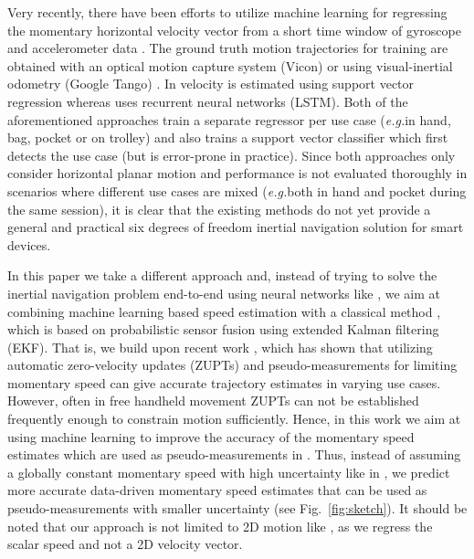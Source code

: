 \documentclass{article}
\newcommand{\eg}{\textit{e.g.}}
\begin{document}
Very recently, there have been efforts to utilize machine learning for regressing the momentary horizontal velocity vector from a short time window of gyroscope and accelerometer data \cite{Yan+Shan+Furukawa:2017,Chen+Lu+Markham+Trigoni:2018}. The ground truth motion trajectories for training are obtained with an optical motion capture system (Vicon) \cite{Chen+Lu+Markham+Trigoni:2018} or using visual-inertial odometry (Google Tango) \cite{Yan+Shan+Furukawa:2017}. In \cite{Yan+Shan+Furukawa:2017} velocity is estimated using support vector regression whereas \cite{Chen+Lu+Markham+Trigoni:2018} uses recurrent neural networks (LSTM). Both of the aforementioned approaches train a separate regressor per use case (\eg\phone in hand, bag, pocket or on trolley) and \cite{Yan+Shan+Furukawa:2017} also trains a support vector classifier which first detects the use case (but is error-prone in practice). Since both approaches only consider horizontal planar motion and performance is not evaluated thoroughly in scenarios where different use cases are mixed (\eg\phone both in hand and pocket during the same session), it is clear that the existing methods do not yet provide a general and practical six degrees of freedom inertial navigation solution for smart devices.

In this paper we take a different approach and, instead of trying to solve the inertial navigation problem end-to-end using neural networks like \cite{Chen+Lu+Markham+Trigoni:2018}, we aim at combining machine learning based speed estimation with a classical method \cite{Solin+Cortes+Rahtu+Kannala}, which is based on probabilistic sensor fusion using extended Kalman filtering (EKF). That is, we build upon recent work \cite{Solin+Cortes+Rahtu+Kannala}, which has shown that utilizing automatic zero-velocity updates (ZUPTs) and pseudo-measurements for limiting momentary speed can give accurate trajectory estimates in varying use cases. However, often in free handheld movement ZUPTs can not be established frequently enough to constrain motion sufficiently. Hence, in this work we aim at using machine learning to improve the accuracy of the momentary speed estimates which are used as pseudo-measurements in \cite{Solin+Cortes+Rahtu+Kannala}. Thus, instead of assuming a globally constant momentary speed with high uncertainty like in \cite{Solin+Cortes+Rahtu+Kannala}, we predict more accurate data-driven momentary speed estimates that can be used as pseudo-measurements with smaller uncertainty (see Fig.~\ref{fig:sketch}). It should be noted that our approach is not limited to 2D motion like \cite{Yan+Shan+Furukawa:2017,Chen+Lu+Markham+Trigoni:2018}, as we regress the scalar speed and not a 2D velocity vector. 
\end{document}
